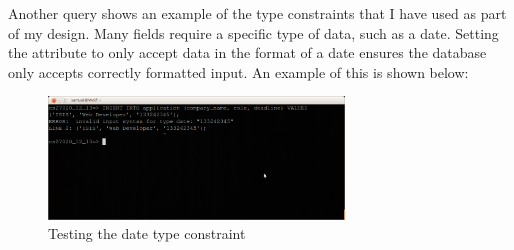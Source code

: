 \documentclass{article}
\begin{document}
Another query shows an example of the type constraints that I have used as part of my design. Many fields require a specific type of data, such as a date. Setting the attribute to only accept data in the format of a date ensures the database only accepts correctly formatted input. An example of this is shown below:

\begin{figure}[H]
\centering
\includegraphics[width=0.7\textwidth]{img/test/test-date.png}
\caption{Testing the date type constraint}
\label{fig:test-date}
\end{figure}
\end{document}
